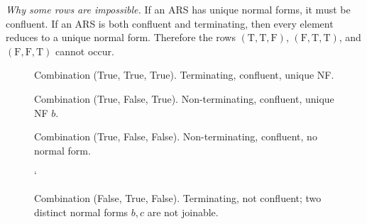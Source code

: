 \documentclass{article}
\theoremstyle{theorem}
\theoremstyle{definition}
\theoremstyle{remark}
\begin{document}
\noindent\textit{Why some rows are impossible.}
If an ARS has unique normal forms, it must be confluent.
If an ARS is both confluent and terminating, then every element reduces to a unique normal form.
Therefore the rows \((\text{T},\text{T},\text{F})\), \((\text{F},\text{T},\text{T})\), and \((\text{F},\text{F},\text{T})\) cannot occur.

\begin{figure}[H]
\centering
{}
\caption{Combination (True, True, True). Terminating, confluent, unique NF.}
\label{fig:combo-ttt}
\end{figure}

\begin{figure}[H]
\centering
{}
\caption{Combination (True, False, True). Non-terminating, confluent, unique NF $b$.}
\label{fig:combo-tft}
\end{figure}

\begin{figure}[H]
\centering
{}
\caption{Combination (True, False, False). Non-terminating, confluent, no normal form.}
\label{fig:combo-tff}
\end{figure}

\begin{figure}[H]
\centering
{}
\caption{Combination (False, True, False). Terminating, not confluent; two distinct normal forms $b,c$ are not joinable.}
\label{fig:combo-ftf}
`\end{figure}
\end{document}

